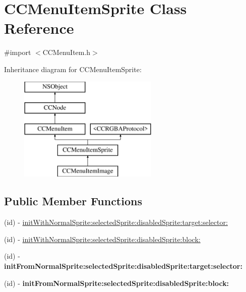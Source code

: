 \hypertarget{class_c_c_menu_item_sprite}{\section{C\-C\-Menu\-Item\-Sprite Class Reference}
\label{class_c_c_menu_item_sprite}
}


{\ttfamily \#import $<$C\-C\-Menu\-Item.\-h$>$}

Inheritance diagram for C\-C\-Menu\-Item\-Sprite\-:\begin{figure}[H]
\begin{center}
\leavevmode
\includegraphics[height=5.000000cm]{class_c_c_menu_item_sprite}
\end{center}
\end{figure}
\subsection*{Public Member Functions}
\begin{DoxyCompactItemize}
\item 
(id) -\/ \hyperlink{class_c_c_menu_item_sprite_af4939c0eaddc6a18443afcaa67f71d35}{init\-With\-Normal\-Sprite\-:selected\-Sprite\-:disabled\-Sprite\-:target\-:selector\-:}
\item 
(id) -\/ \hyperlink{class_c_c_menu_item_sprite_acc5e155be2479ac34a0c97388b30c2a9}{init\-With\-Normal\-Sprite\-:selected\-Sprite\-:disabled\-Sprite\-:block\-:}
\item 
\hypertarget{class_c_c_menu_item_sprite_abf4ff7115eacf9dac3bdc96b6df50826}{(id) -\/ {\bfseries init\-From\-Normal\-Sprite\-:selected\-Sprite\-:disabled\-Sprite\-:target\-:selector\-:}}\label{class_c_c_menu_item_sprite_abf4ff7115eacf9dac3bdc96b6df50826}

\item 
\hypertarget{class_c_c_menu_item_sprite_a415525be842040563227475c53c6fa83}{(id) -\/ {\bfseries init\-From\-Normal\-Sprite\-:selected\-Sprite\-:disabled\-Sprite\-:block\-:}}\label{class_c_c_menu_item_sprite_a415525be842040563227475c53c6fa83}

\end{DoxyCompactItemize}
